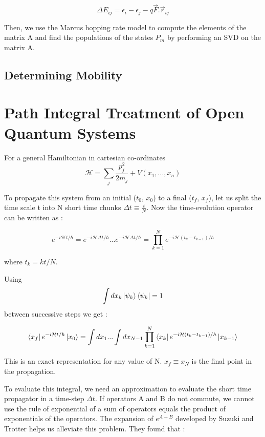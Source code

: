 \begin{equation}
    \Delta E_{ij} = \epsilon_{i} - \epsilon_{j} - q \vec{F} . \vec{r}_{ij}
\end{equation}

Then, we use the Marcus hopping rate model to compute the elements of the matrix A  and find the populations of the states $P_m$ by performing an SVD on the matrix A. 

\subsection{Determining Mobility}


\section{Path Integral Treatment of Open Quantum Systems}



For a general Hamiltonian in cartesian co-ordinates $$\mathcal{H} = \sum_{j} \frac{p_j^2}{2m_j} + V(x_1, ..., x_n)$$

To propagate this system from an initial ($t_0$, $x_0$) to a final ($t_f$, $x_f$), let us split the time scale t into N short time chunks $\Delta t \equiv \frac{t}{N}$. Now the time-evolution operator can be written as :

\begin{equation} \label{4.x}
    e^{-i\mathcal{H}t/\hbar} = e^{-i\mathcal{H}\Delta t/\hbar}...e^{-i\mathcal{H}\Delta t/\hbar} = \prod_{k=1}^{N} e^{-i\mathcal{H}(t_k - t_{k-1})/\hbar}
\end{equation}

where $t_k = kt/N$. 

Using $$\int dx_k \ket{\psi_k}\bra{\psi_k} = 1$$ between successive steps we get :

\begin{equation} \label{4.xx}
    \bra{x_f} e^{-i\mathcal{H}t/\hbar} \ket{x_0} = \int dx_1 ... \int dx_{N-1} \prod_{k=1}^{N} \bra{x_k} e^{-i\mathcal{H}(t_k - t_{k-1})/\hbar} \ket{x_{k-1}}
\end{equation}

This is an exact representation for any value of N. $x_f \equiv x_N$ is the final point in the  propagation.

To evaluate this integral, we need an approximation to evaluate the short time propagator in a time-step $\Delta t$. If operators A and B do not commute, we cannot use the rule of exponential of a sum of operators equals the product of exponentials of the operators. The expansion of $e^{A+B}$ developed by Suzuki and Trotter \cite{trotter1959} helps us alleviate this problem. They found that :


